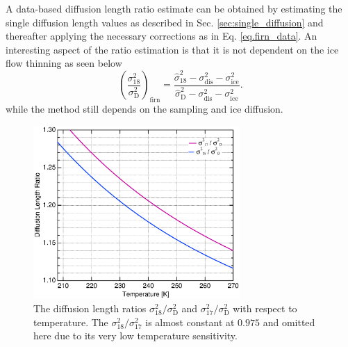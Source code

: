 \documentclass[11pt, draftcls, onecolumn]{IEEEtran} %
\numberwithin{equation}{section}
\numberwithin{table}{section}
\numberwithin{figure}{section}
\begin{document}
A data-based diffusion length ratio estimate can be obtained by estimating the single 
diffusion length values as described in Sec. \ref{sec:single_diffusion}
and thereafter applying the necessary corrections as in Eq. \ref{eq.firn_data}. 
An interesting aspect of the ratio estimation is that it is not dependent on the
ice flow thinning as seen below
\begin{equation} 
\left( \frac{\sigma^2_{18}}{\sigma^2_\mathrm{D}} \right)_{\mathrm{firn}}  =
\frac{ \hat{\sigma}^2_{18} - \sigma^2_{\mathrm{dis}} - \sigma^2_{\mathrm{ice}} }{\hat{\sigma}^2_{\mathrm{D}} - 
	\sigma^2_{\mathrm{dis}} - \sigma^2_{\mathrm{ice}} }.
\end{equation}
while the method still depends on the sampling and ice diffusion.
\begin{figure}[]	
	\vspace*{2mm}	
	\begin{center}		
		\includegraphics[width=0.7\textwidth]{Figure_9}		
		\caption{The diffusion length ratios $\sigma^2_{18}/\sigma^2_{\mathrm{D}}$ and $\sigma^2_{17}/\sigma^2_{\mathrm{D}}$
			with respect to temperature.
			The $\sigma^2_{18}/\sigma^2_{17}$ is almost constant at $0.975$ and omitted here due to its very low temperature sensitivity.} 		
		\label{fig:diff_len_ratio}	
	\end{center}
\end{figure}
\end{document}
